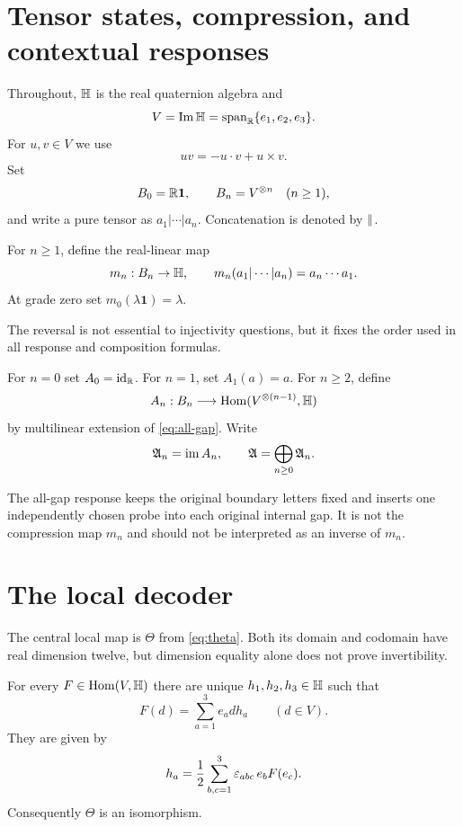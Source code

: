 \section{Tensor states, compression, and contextual responses}\label{sec:setup}

Throughout, $\mathbb H$ is the real quaternion algebra and
\[
  V=\operatorname{Im}\mathbb H=\operatorname{span}_{\mathbb R}\{e_1,e_2,e_3\}.
\]
For $u,v\in V$ we use
\begin{equation}\label{eq:qproduct}
  uv=-u\cdot v+u\times v.
\end{equation}
Set
\[
  B_0=\mathbb R\mathbf 1,\qquad B_n=V^{\otimes n}\quad(n\ge 1),
\]
and write a pure tensor as $a_1|\cdots|a_n$.  Concatenation is denoted by $\mathbin{\Vert}$.

\begin{definition}
For $n\ge 1$, define the real-linear map
\[
  m_n:B_n\to\mathbb H,
  \qquad
  m_n(a_1|\cdots|a_n)=a_n\cdots a_1.
\]
At grade zero set $m_0(\lambda\mathbf 1)=\lambda$.
\end{definition}

The reversal is not essential to injectivity questions, but it fixes the order used in all response and composition formulas.

\begin{definition}
For $n=0$ set $A_0=\operatorname{id}_{\mathbb R}$.  For $n=1$, set $A_1(a)=a$.  For $n\ge 2$, define
\[
  A_n:B_n\longrightarrow \operatorname{Hom}(V^{\otimes(n-1)},\mathbb H)
\]
by multilinear extension of \eqref{eq:all-gap}.  Write
\[
  \mathfrak A_n=\operatorname{im} A_n,
  \qquad
  \mathfrak A=\bigoplus_{n\ge 0}\mathfrak A_n.
\]
\end{definition}

The all-gap response keeps the original boundary letters fixed and inserts one independently chosen probe into each original internal gap.  It is not the compression map $m_n$ and should not be interpreted as an inverse of $m_n$.

\section{The local decoder}\label{sec:local-decoder}

The central local map is $\Theta$ from \eqref{eq:theta}.  Both its domain and codomain have real dimension twelve, but dimension equality alone does not prove invertibility.

\begin{theorem}\label{thm:theta-inverse}
For every $F\in\operatorname{Hom}(V,\mathbb H)$ there are unique $h_1,h_2,h_3\in\mathbb H$ such that
\[
  F(d)=\sum_{a=1}^3 e_a d h_a\qquad(d\in V).
\]
They are given by
\begin{equation}\label{eq:theta-inverse}
  h_a=\frac12\sum_{b,c=1}^3\varepsilon_{abc}\,e_bF(e_c).
\end{equation}
Consequently $\Theta$ is an isomorphism.
\end{theorem}

